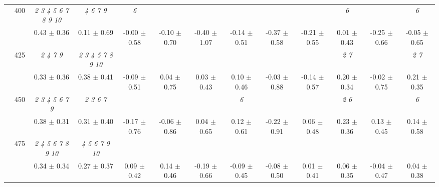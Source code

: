 \begin{table}[h]
{\begin{tabular}{
        ccccccccccccc}
 & \multirow{2}{*}{400}& \textit{  2  3  4  5  6  7  8  9 10 }& \textit{ 4 6 7 9 }& \textit{ 6 }& & & & & & \textit{ 6 }& & \textit{ 6 } \\ 
 & & 0.43 $\pm$ 0.36& 0.11 $\pm$ 0.69& -0.00 $\pm$ 0.58& -0.10 $\pm$ 0.70& -0.40 $\pm$ 1.07& -0.14 $\pm$ 0.51& -0.37 $\pm$ 0.58& -0.21 $\pm$ 0.55& 0.01 $\pm$ 0.43& -0.25 $\pm$ 0.66& -0.05 $\pm$ 0.65 \\ 
 & \multirow{2}{*}{425}& \cellcolor[HTML]{EFEFEF} \textit{ 2 4 7 9 }& \cellcolor[HTML]{EFEFEF} \textit{  2  3  4  5  7  8  9 10 }& \cellcolor[HTML]{EFEFEF} & \cellcolor[HTML]{EFEFEF} & \cellcolor[HTML]{EFEFEF} & \cellcolor[HTML]{EFEFEF} & \cellcolor[HTML]{EFEFEF} & \cellcolor[HTML]{EFEFEF} & \cellcolor[HTML]{EFEFEF} \textit{ 2 7 }& \cellcolor[HTML]{EFEFEF} & \cellcolor[HTML]{EFEFEF} \textit{ 2 7 } \\ 
 & & \cellcolor[HTML]{EFEFEF} 0.33 $\pm$ 0.36& \cellcolor[HTML]{EFEFEF} 0.38 $\pm$ 0.41& \cellcolor[HTML]{EFEFEF} -0.09 $\pm$ 0.51& \cellcolor[HTML]{EFEFEF} 0.04 $\pm$ 0.75& \cellcolor[HTML]{EFEFEF} 0.03 $\pm$ 0.43& \cellcolor[HTML]{EFEFEF} 0.10 $\pm$ 0.46& \cellcolor[HTML]{EFEFEF} -0.03 $\pm$ 0.88& \cellcolor[HTML]{EFEFEF} -0.14 $\pm$ 0.57& \cellcolor[HTML]{EFEFEF} 0.20 $\pm$ 0.34& \cellcolor[HTML]{EFEFEF} -0.02 $\pm$ 0.75& \cellcolor[HTML]{EFEFEF} 0.21 $\pm$ 0.35 \\ 
 & \multirow{2}{*}{450}& \textit{ 2 3 4 5 6 7 9 }& \textit{ 2 3 6 7 }& & & & \textit{ 6 }& & & \textit{ 2 6 }& & \textit{ 6 } \\ 
 & & 0.38 $\pm$ 0.31& 0.31 $\pm$ 0.40& -0.17 $\pm$ 0.76& -0.06 $\pm$ 0.86& 0.04 $\pm$ 0.65& 0.12 $\pm$ 0.61& -0.22 $\pm$ 0.91& 0.06 $\pm$ 0.48& 0.23 $\pm$ 0.36& 0.13 $\pm$ 0.45& 0.14 $\pm$ 0.58 \\ 
 & \multirow{2}{*}{475}& \cellcolor[HTML]{EFEFEF} \textit{  2  4  5  6  7  8  9 10 }& \cellcolor[HTML]{EFEFEF} \textit{  4  5  6  7  9 10 }& \cellcolor[HTML]{EFEFEF} & \cellcolor[HTML]{EFEFEF} & \cellcolor[HTML]{EFEFEF} & \cellcolor[HTML]{EFEFEF} & \cellcolor[HTML]{EFEFEF} & \cellcolor[HTML]{EFEFEF} & \cellcolor[HTML]{EFEFEF} & \cellcolor[HTML]{EFEFEF} & \cellcolor[HTML]{EFEFEF}  \\ 
 & & \cellcolor[HTML]{EFEFEF} 0.34 $\pm$ 0.34& \cellcolor[HTML]{EFEFEF} 0.27 $\pm$ 0.37& \cellcolor[HTML]{EFEFEF} 0.09 $\pm$ 0.42& \cellcolor[HTML]{EFEFEF} 0.14 $\pm$ 0.46& \cellcolor[HTML]{EFEFEF} -0.19 $\pm$ 0.66& \cellcolor[HTML]{EFEFEF} -0.09 $\pm$ 0.45& \cellcolor[HTML]{EFEFEF} -0.08 $\pm$ 0.50& \cellcolor[HTML]{EFEFEF} 0.01 $\pm$ 0.41& \cellcolor[HTML]{EFEFEF} 0.06 $\pm$ 0.35& \cellcolor[HTML]{EFEFEF} -0.04 $\pm$ 0.47& \cellcolor[HTML]{EFEFEF} 0.04 $\pm$ 0.38 \\ 

\end{tabular}}
\end{table}

